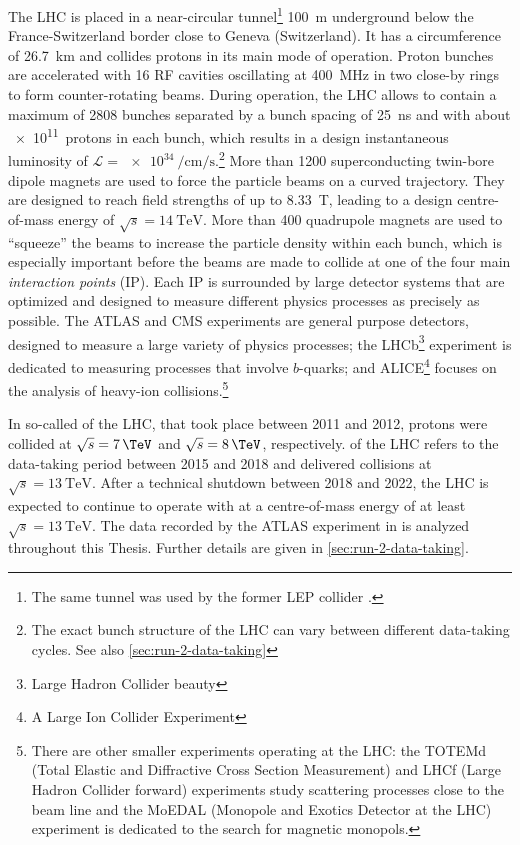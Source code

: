 The LHC is placed in a near-circular tunnel\footnote{The same tunnel was used by the former LEP collider \cites{LEPDesignReport}.} \SI{100}{\m} underground below the France-Switzerland border close to Geneva (Switzerland). It has a circumference of \SI{26.7}{\km} and collides protons in its main mode of operation. Proton bunches are accelerated with 16 RF cavities oscillating at \SI{400}{\mega\hertz} in two close-by rings to form counter-rotating beams. During operation, the LHC allows to contain a maximum of 2808 bunches separated by a bunch spacing of \SI{25}{\ns} and with about \SI{e11}{protons} in each bunch, which results in a design instantaneous luminosity of $\mathcal{L} = \SI{e34}{\per\cm\per\s}$.\footnote{The exact bunch structure of the LHC can vary between different data-taking cycles. See also \cref{sec:run-2-data-taking}}
More than 1200 superconducting twin-bore dipole magnets are used to force the particle beams on a curved trajectory.
They are designed to reach field strengths of up to \SI{8.33}{\tesla}, leading to a design centre-of-mass energy of $\sqrt{s} = \SI{14}{\TeV}$. More than 400 quadrupole magnets are used to ``squeeze'' the beams to increase the particle density within each bunch, which is especially important before the beams are made to collide at one of the four main \emph{interaction points} (IP). Each IP is surrounded by large detector systems that are optimized and designed to measure different physics processes as precisely as possible.
The ATLAS and CMS \cite{CMS-TDR-08-001} experiments are general purpose detectors, designed to measure a large variety of physics processes; the LHCb\footnote{Large Hadron Collider beauty} experiment \cite{1748-0221-3-08-S08005} is dedicated to measuring processes that involve $b$-quarks; and ALICE\footnote{A Large Ion Collider Experiment} \cite{1748-0221-3-08-S08002} focuses on the analysis of heavy-ion collisions.\footnote{There are other smaller experiments operating at the LHC: the TOTEMd (Total Elastic and Diffractive Cross Section Measurement) \cite{1748-0221-3-08-S08007} and LHCf (Large Hadron Collider forward) \cite{1748-0221-3-08-S08006} experiments study scattering processes close to the beam line and the MoEDAL (Monopole and Exotics Detector at the LHC) experiment \cite{1742-6596-631-1-012014} is dedicated to the search for magnetic monopols.}

In so-called \RunOne of the LHC, that took place between 2011 and 2012, protons were collided at $\sqrt{s} = 7\,\TeV$ and $\sqrt{s} = 8\,\TeV$, respectively. \RunTwo of the LHC refers to the data-taking period between 2015 and 2018 and delivered collisions at $\sqrt{s} = \SI{13}{\TeV}$. After a technical shutdown between 2018 and 2022, the LHC is expected to continue to operate with \RunThr at a centre-of-mass energy of at least $\sqrt{s} = \SI{13}{\TeV}$.
The data recorded by the ATLAS experiment in \RunTwo is analyzed throughout this Thesis. Further details are given in \cref{sec:run-2-data-taking}.



